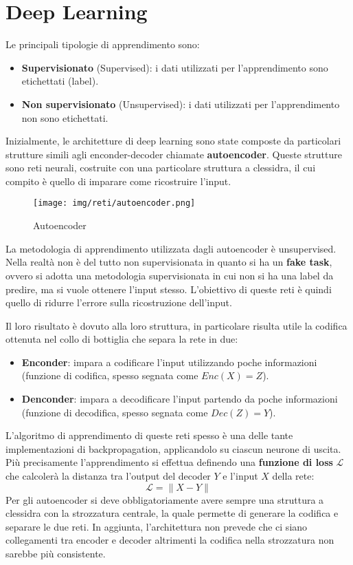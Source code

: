 \chapter{Deep Learning}
Le principali tipologie di apprendimento sono:
\begin{itemize}
      \item \textbf{Supervisionato} (Supervised): i dati utilizzati per
            l'apprendimento sono etichettati (label).
      \item \textbf{Non supervisionato} (Unsupervised): i dati utilizzati per
            l'apprendimento non sono etichettati.
\end{itemize}
Inizialmente, le architetture di deep learning sono state composte da
particolari strutture simili agli enconder-decoder chiamate \textbf{autoencoder}.
Queste strutture sono reti neurali, costruite con una particolare struttura a
clessidra, il cui compito è quello di imparare come ricostruire l'input.
\begin{figure}[!ht]
      \centering
      \texttt{[image: img/reti/autoencoder.png]}
      \caption{Autoencoder}
      \label{fig:autoencoder}
\end{figure}
La metodologia di apprendimento utilizzata dagli autoencoder è unsupervised.
Nella realtà non è del tutto non supervisionata in quanto si ha un \textbf{fake
      task}, ovvero si adotta una metodologia supervisionata in cui non si ha
una label da predire, ma si vuole ottenere l'input stesso. L'obiettivo di
queste reti è quindi quello di ridurre l'errore sulla ricostruzione dell'input.

Il loro risultato è dovuto alla loro struttura, in particolare risulta utile la
codifica ottenuta nel collo di bottiglia che separa la rete in due:
\begin{itemize}
      \item \textbf{Enconder}: impara a codificare l'input utilizzando poche
            informazioni (funzione di codifica, spesso segnata come $Enc(X) = Z$).
      \item \textbf{Denconder}: impara a decodificare l'input partendo da poche
            informazioni (funzione di decodifica, spesso segnata come $Dec(Z) = Y$).
\end{itemize}
L'algoritmo di apprendimento di queste reti spesso è una delle tante
implementazioni di backpropagation, applicandolo su ciascun neurone di uscita.
Più precisamente l'apprendimento si effettua definendo una \textbf{funzione di
      loss} $\mathcal{L}$ che calcolerà la distanza tra l'output del decoder $Y$
e l'input $X$ della rete:
\begin{equation}
      \mathcal{L} = \| X - Y \|
\end{equation}
Per gli autoencoder si deve obbligatoriamente avere sempre una struttura a
clessidra con la strozzatura centrale, la quale permette di generare la codifica
e separare le due reti. In aggiunta, l'architettura non prevede che ci siano
collegamenti tra encoder e decoder altrimenti la codifica nella strozzatura non
sarebbe più consistente.

